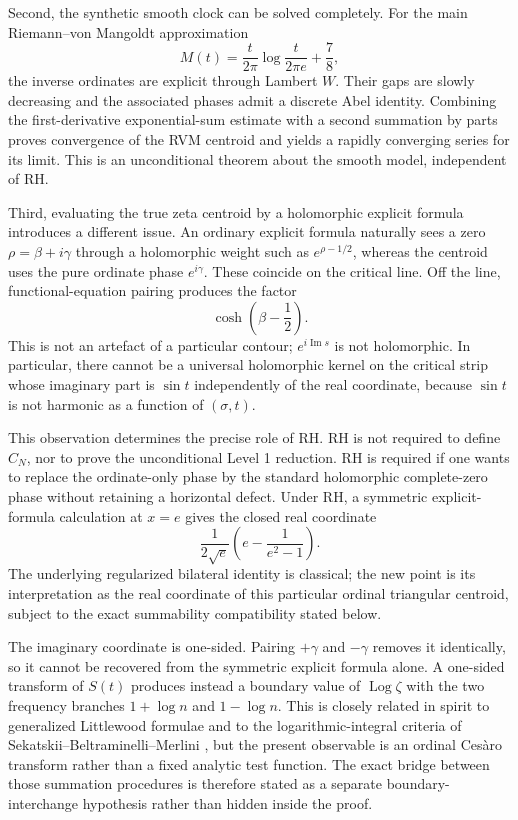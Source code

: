 \documentclass[11pt]{amsart}
\numberwithin{equation}{section}
\theoremstyle{definition}
\theoremstyle{remark}
\newcommand{\Log}{\operatorname{Log}}
\begin{document}
Second, the synthetic smooth clock can be solved completely.  For the main Riemann--von Mangoldt approximation
\[
M(t)=\frac{t}{2\pi}\log\frac{t}{2\pi e}+\frac78,
\]
the inverse ordinates are explicit through Lambert $W$.  Their gaps are slowly decreasing and the associated phases admit a discrete Abel identity.  Combining the first-derivative exponential-sum estimate with a second summation by parts proves convergence of the RVM centroid and yields a rapidly converging series for its limit.  This is an unconditional theorem about the smooth model, independent of RH.

Third, evaluating the true zeta centroid by a holomorphic explicit formula introduces a different issue.  An ordinary explicit formula naturally sees a zero $\rho=\beta+i\gamma$ through a holomorphic weight such as $e^{\rho-1/2}$, whereas the centroid uses the pure ordinate phase $e^{i\gamma}$.  These coincide on the critical line.  Off the line, functional-equation pairing produces the factor
\[
\cosh\!\left(\beta-\frac12\right).
\]
This is not an artefact of a particular contour; $e^{i\operatorname{Im}s}$ is not holomorphic.  In particular, there cannot be a universal holomorphic kernel on the critical strip whose imaginary part is $\sin t$ independently of the real coordinate, because $\sin t$ is not harmonic as a function of $(\sigma,t)$.

This observation determines the precise role of RH.  RH is not required to define $C_N$, nor to prove the unconditional Level 1 reduction.  RH is required if one wants to replace the ordinate-only phase by the standard holomorphic complete-zero phase without retaining a horizontal defect.  Under RH, a symmetric explicit-formula calculation at $x=e$ gives the closed real coordinate
\[
\frac{1}{2\sqrt e}\left(e-\frac1{e^2-1}\right).
\]
The underlying regularized bilateral identity is classical; the new point is its interpretation as the real coordinate of this particular ordinal triangular centroid, subject to the exact summability compatibility stated below.

The imaginary coordinate is one-sided.  Pairing $+\gamma$ and $-\gamma$ removes it identically, so it cannot be recovered from the symmetric explicit formula alone.  A one-sided transform of $S(t)$ produces instead a boundary value of $\Log\zeta$ with the two frequency branches $1+\log n$ and $1-\log n$.  This is closely related in spirit to generalized Littlewood formulae and to the logarithmic-integral criteria of Sekatskii--Beltraminelli--Merlini \cite{Sekatskii2008,Sekatskii2009,Sekatskii2010}, but the present observable is an ordinal Cesàro transform rather than a fixed analytic test function.  The exact bridge between those summation procedures is therefore stated as a separate boundary-interchange hypothesis rather than hidden inside the proof.
\end{document}
